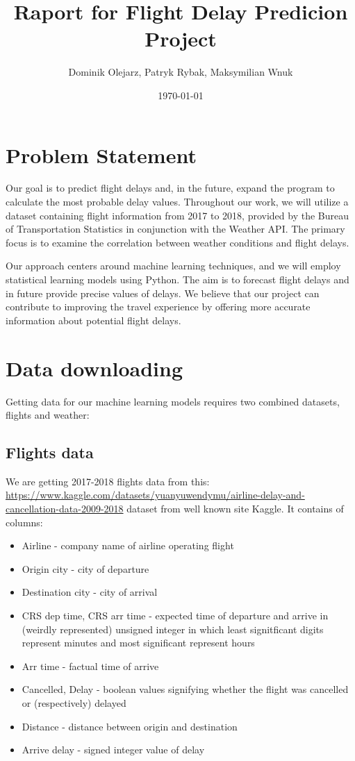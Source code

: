 \documentclass{article}
\title{Raport for Flight Delay Predicion Project} %
\author{Dominik Olejarz, Patryk Rybak, Maksymilian Wnuk} %
\date{\today} %
\begin{document}
 \maketitle
    
 \section{Problem Statement} %

Our goal is to predict flight delays and, in the future, expand the program to calculate the most probable delay values. Throughout our work, we will utilize a dataset containing flight information from 2017 to 2018, provided by the Bureau of Transportation Statistics in conjunction with the Weather API. The primary focus is to examine the correlation between weather conditions and flight delays.

Our approach centers around machine learning techniques, and we will employ statistical learning models using Python. The aim is to forecast flight delays and in future provide precise values of delays. We believe that our project can contribute to improving the travel experience by offering more accurate information about potential flight delays.

    
 \section{Data downloading}
Getting data for our machine learning models requires two combined datasets, 
flights and weather:
	\subsection{Flights data}
		We are getting 2017-2018 flights data from this: \url{https://www.kaggle.com/datasets/yuanyuwendymu/airline-delay-and-cancellation-data-2009-2018} dataset from well known site Kaggle.
		It contains of columns:	
			\begin{itemize}
\item Airline - company name of airline operating flight
\item Origin city  - city of departure
\item Destination city - city of arrival
\item CRS dep time, CRS arr time - expected time of departure and arrive in (weirdly represented) unsigned integer in which 
		least signitficant digits represent minutes and most significant represent hours
\item Arr time - factual time of arrive
\item Cancelled, Delay - boolean values signifying whether the flight was cancelled or (respectively) delayed
\item Distance  - distance between origin and destination
\item Arrive delay - signed integer value of delay
				
			\end{itemize}
\end{document}
